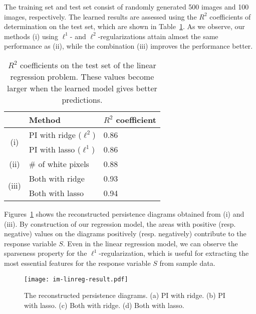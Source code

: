 \documentclass[smallextended]{svjour3}
\begin{document}
The training set and test set consist of randomly generated 500 images and 100 images, respectively. The learned results are assessed using the $R^2$ coefficients of determination\citep{statistics} on the test set, which are shown in Table~\ref{tab:linreg_r2}.
As we observe, our methods (i) using $\ell^1$- and $\ell^2$-regularizations attain almost the same performance as (ii), while the combination (iii) improves the performance better. 

\begin{table}[htbp]
  \centering
  \begin{tabular}{|c|l|l|} \hline
    &Method & $R^2$ coefficient \\ \hline\hline
    \multirow{2}{*}{(i)} & PI with ridge ($\ell^2$) & 0.86 \\ \cline{2-3} %
    &PI with lasso ($\ell^1$) & 0.86 \\ \hline %
    (ii)&\# of white pixels & 0.88 \\ \hline %
    \multirow{2}{*}{(iii)}&Both with ridge & 0.93 \\ \cline{2-3} %
    &Both with lasso & 0.94 \\ \hline %
  \end{tabular}
  \caption{$R^2$ coefficients on the test set of the linear regression problem. These values become larger when the learned model gives better predictions.}
  \label{tab:linreg_r2}
\end{table}

Figures~\ref{fig:ridge_lasso} shows the reconstructed persistence diagrams obtained from (i) and (iii). By construction of our regression model, the areas with  positive (resp. negative) values on the diagrams positively (resp. negatively) contribute to the response variable $S$. Even in the linear regression model, we can observe the sparseness property for the $\ell^1$-regularization, which is useful for extracting the most essential features for the response variable $S$ from sample data. 


\begin{figure}[htbp]
  \centering
  \texttt{[image: im-linreg-result.pdf]}
  \caption{The reconstructed persistence diagrams. (a) PI with ridge. (b) PI with lasso. (c) Both with ridge. (d) Both with lasso.}
  \label{fig:ridge_lasso}
\end{figure}
\end{document}
